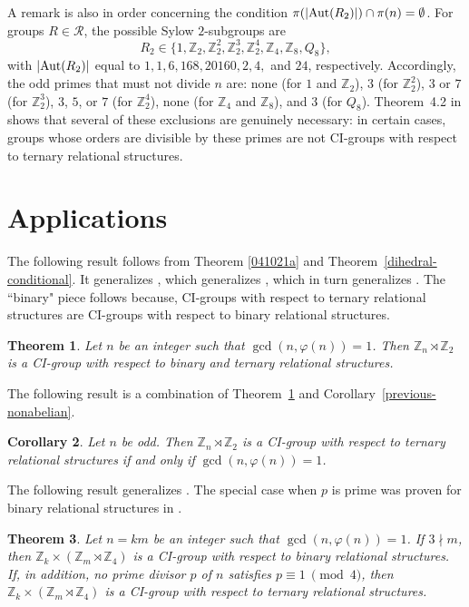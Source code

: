 \documentclass[11pt]{amsart}
\numberwithin{equation}{section}
\newtheorem{thrm}{Theorem}[section]
\newtheorem{cor}[thrm]{Corollary}
\theoremstyle{definition}
\newcounter{case}
\def\Aut{{\rm Aut}}
\def\Z{{\mathbb Z}}
\begin{document}
	A remark is also in order concerning the condition $\pi(|\Aut(R_2)|)\cap \pi(n)=\emptyset$.  
	For groups $R \in \mathcal{R}$, the possible Sylow $2$-subgroups are  
	$$R_2 \in \{1, \Z_2, \Z_2^2, \Z_2^3, \Z_2^4, \Z_4, \Z_8, Q_8\},$$  
	with $|\Aut(R_2)|$ equal to  
	$1, 1, 6, 168, 20160, 2, 4,$ and $24$, respectively.  
	Accordingly, the odd primes that must not divide $n$ are: none (for $1$ and $\Z_2$), $3$ (for $\Z_2^2$), $3$ or $7$ (for $\Z_2^3$), $3$, $5$, or $7$ (for $\Z_2^4$), none (for $\Z_4$ and $\Z_8$), and $3$ (for $Q_8$).  
	Theorem~4.2 in \cite{DobsonS2013} shows that several of these exclusions are genuinely necessary: in certain cases, groups whose orders are divisible by these primes are not CI-groups with respect to ternary relational structures.
	
	\section{Applications}
	
	The following result follows from Theorem \ref{041021a} and Theorem~\ref{dihedral-conditional}.  It generalizes \cite[Corollary 17]{Dobson2003}, which generalizes \cite[Theorem 22]{Dobson2002}, which in turn generalizes \cite[Theorem 4.4]{Babai1977}. The ``binary" piece follows because,  CI-groups with respect to ternary relational structures are CI-groups with respect to binary relational structures.
	
	\begin{thrm}\label{ternarymain}
		Let $n$ be an integer such that $\gcd(n,\varphi(n)) = 1$.  Then $\Z_n\rtimes\Z_2$ is a CI-group with respect to binary and ternary relational structures.
	\end{thrm}
	
	The following result is a combination of Theorem~\ref{ternarymain} and Corollary~\ref{previous-nonabelian}.
	
	\begin{cor}\label{dihedral cor}
		Let $n$ be odd.  Then $\Z_n\rtimes\Z_2$ is a CI-group with respect to ternary relational structures if and only if $\gcd(n,\varphi(n)) = 1$.
	\end{cor}
	
	
	The following result
	generalizes \cite[Corollary 29]{Dobson2003}.  The special case when $p$ is prime was proven for binary relational structures in \cite[Theorem 1.3]{LiLP2007}.
	
	\begin{thrm}\label{231221a}
		Let $n = km$ be an integer such that $\gcd(n,\varphi(n)) = 1$.  If $3\nmid m$, then $\Z_k\times(\Z_m\rtimes\Z_4)$ is a CI-group with respect to binary relational structures. If, in addition, no prime divisor $p$ of $n$ satisfies $p\equiv 1\ \pmod{4}$, then $\Z_k\times(\Z_m\rtimes\Z_4)$ is a CI-group with respect to ternary relational structures.
	\end{thrm}
	
\end{document}
